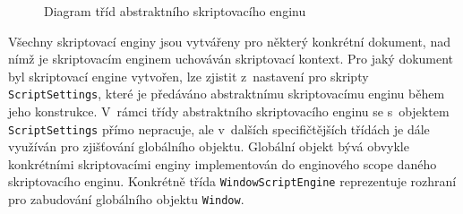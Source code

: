 \begin{figure}[H]
  \begin{center}
    \caption{Diagram tříd abstraktního skriptovacího enginu}
    \label{Figure.BrowserScriptEngine}
  \end{center}
\end{figure}

\vspace{-1em}

Všechny skriptovací enginy jsou vytvářeny pro některý konkrétní dokument, nad nímž je skriptovacím enginem uchováván skriptovací kontext. Pro jaký dokument byl skriptovací engine vytvořen, lze zjistit z~nastavení pro skripty \texttt{ScriptSettings}, které je předáváno abstraktnímu skriptovacímu enginu během jeho konstrukce. V~rámci třídy abstraktního skriptovacího enginu se s~objektem \texttt{ScriptSettings} přímo nepracuje, ale v~dalších specifičtějších třídách je dále využíván pro zjišťování globálního objektu. Globální objekt bývá obvykle konkrétními skriptovacími enginy implementován do enginového scope  daného skriptovacího enginu. Konkrétně třída \texttt{WindowScriptEngine} reprezentuje rozhraní pro zabudování globálního objektu \texttt{Window}.

